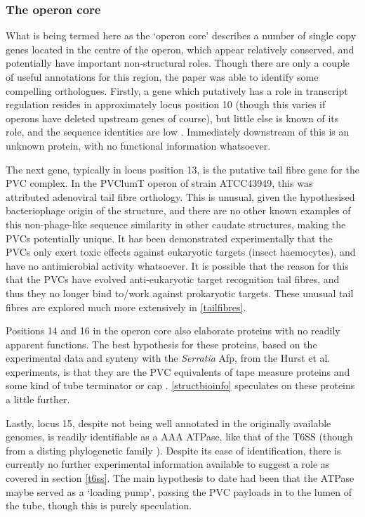 \subsubsection{The operon core}
What is being termed here as the `operon core' describes a number of single copy genes located in the centre of the operon, which appear relatively conserved, and potentially have important non-structural roles. Though there are only a couple of useful annotations for this region, the \cite{Yang2006} paper was able to identify some compelling orthologues. Firstly, a gene which putatively has a role in transcript regulation resides in approximately locus position 10 (though this varies if operons have deleted upstream genes of course), but little else is known of its role, and the sequence identities are low \citep{Waterfield2009}. Immediately downstream of this is an unknown protein, with no functional information whatsoever.

The next gene, typically in locus position 13, is the putative tail fibre gene for the PVC complex. In the PVClumT operon of strain ATCC43949, this was attributed adenoviral tail fibre orthology. This is unusual, given the hypothesised bacteriophage origin of the structure, and there are no other known examples of this non-phage-like sequence similarity in other caudate structures, making the PVCs potentially unique. It has been demonstrated experimentally that the PVCs only exert toxic effects against eukaryotic targets (insect haemocytes), and have no antimicrobial activity whatsoever. It is possible that the reason for this that the PVCs have evolved anti-eukaryotic target recognition tail fibres, and thus they no longer bind to/work against prokaryotic targets. These unusual tail fibres are explored much more extensively in \vref{tailfibres}.

Positions 14 and 16 in the operon core also elaborate proteins with no readily apparent functions. The best hypothesis for these proteins, based on the experimental data and synteny with the \emph{Serratia} Afp, from the Hurst et al. experiments, is that they are the PVC equivalents of tape measure proteins and some kind of tube terminator or cap \citep{Rybakova2013, Rybakova2015a}. \vref{structbioinfo} speculates on these proteins a little further.

Lastly, locus 15, despite not being well annotated in the originally available genomes, is readily identifiable as a AAA ATPase, like that of the T6SS (though from a disting phylogenetic family \citep{Frickey2004}). Despite its ease of identification, there is currently no further experimental information available to suggest a role as covered in section \vref{t6ss}. The main hypothesis to date had been that the ATPase maybe served as a `loading pump', passing the PVC payloads in to the lumen of the tube, though this is purely speculation.

